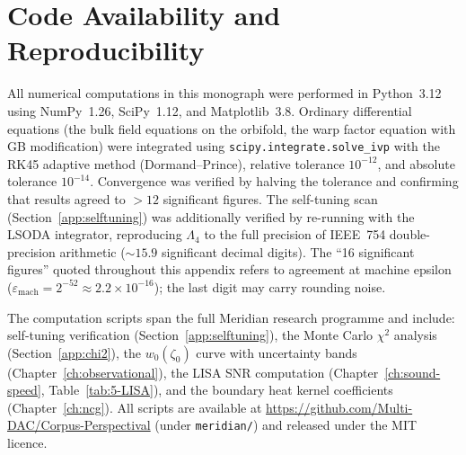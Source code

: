 \section{Code Availability and Reproducibility}
\label{app:code}

All numerical computations in this monograph were performed in Python~3.12 using NumPy~1.26, SciPy~1.12, and Matplotlib~3.8. Ordinary differential equations (the bulk field equations on the orbifold, the warp factor equation with GB modification) were integrated using \texttt{scipy.integrate.solve\_ivp} with the RK45 adaptive method (Dormand--Prince), relative tolerance $10^{-12}$, and absolute tolerance $10^{-14}$. Convergence was verified by halving the tolerance and confirming that results agreed to $> 12$ significant figures. The self-tuning scan (Section~\ref{app:selftuning}) was additionally verified by re-running with the LSODA integrator, reproducing $\Lambda_4$ to the full precision of IEEE~754 double-precision arithmetic (${\sim}15.9$ significant decimal digits). The ``16 significant figures'' quoted throughout this appendix refers to agreement at machine epsilon ($\varepsilon_{\mathrm{mach}} = 2^{-52} \approx 2.2 \times 10^{-16}$); the last digit may carry rounding noise.

The computation scripts span the full Meridian research programme and include: self-tuning verification (Section~\ref{app:selftuning}), the Monte Carlo $\chi^2$ analysis (Section~\ref{app:chi2}), the $w_0(\zeta_0)$ curve with uncertainty bands (Chapter~\ref{ch:observational}), the LISA SNR computation (Chapter~\ref{ch:sound-speed}, Table~\ref{tab:5-LISA}), and the boundary heat kernel coefficients (Chapter~\ref{ch:ncg}). All scripts are available at \url{https://github.com/Multi-DAC/Corpus-Perspectival} (under \texttt{meridian/}) and released under the MIT licence.
